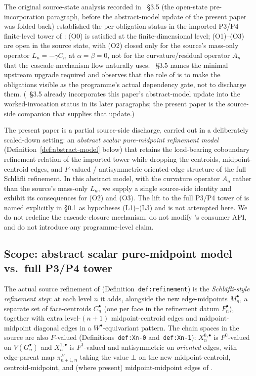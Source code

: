 \documentclass[11pt]{article}
\theoremstyle{plain}
\theoremstyle{definition}
\theoremstyle{remark}
\begin{document}
The original source-state analysis recorded in
\cite{CascadeMechanism}~\S3.5 (the open-state pre-incorporation
paragraph, before the abstract-model update of the present paper
was folded back) established the per-obligation status in the
imported P3/P4 finite-level tower of
\cite{CascadeRefinementSpaces, CascadeClosureDynamics}: (O0) is
satisfied at the finite-dimensional level; (O1)--(O3) are open in
the source state, with (O2) closed only for the source's mass-only
operator $L_n = -\gamma C_n$ at $\alpha = \beta = 0$, not for the
curvature/residual operator $A_n$ that the cascade-mechanism flow
naturally uses. \cite{CascadeMechanism}~\S3.5 names the minimal
upstream upgrade required and observes that the role of
\cite{CascadeMechanism} is to make the obligations visible as the
programme's actual dependency gate, not to discharge them.
(\cite{CascadeMechanism}~\S3.5 already incorporates this paper's
abstract-model update into the worked-invocation status in its
later paragraphs; the present paper is the source-side companion
that supplies that update.)

The present paper is a partial source-side discharge, carried out
in a deliberately scaled-down setting: an \emph{abstract scalar
pure-midpoint refinement model} (Definition~\ref{def:abstract-model}
below) that retains the load-bearing coboundary refinement relation
of the imported tower while dropping the centroids,
midpoint-centroid edges, and $F$-valued / antisymmetric oriented-edge
structure of the full Schl\"{a}fli refinement. In this abstract
model, with the curvature operator $A_n$ rather than the source's
mass-only $L_n$, we supply a single source-side identity and
exhibit its consequences for (O2) and (O3). The lift to the full
P3/P4 tower of \cite{CascadeRefinementSpaces, CascadeClosureDynamics}
is named explicitly in \S\ref{sec:scope-and-gap} as hypotheses
\textup{(L1)}--\textup{(L3)} and is not attempted here. We do not
redefine the cascade-closure mechanism, do not modify
\cite{CascadeMechanism}'s consumer API, and do not introduce any
programme-level claim.

\subsection{Scope: abstract scalar pure-midpoint model vs.\ full P3/P4 tower}\label{sec:scope-and-gap}

The actual source refinement of \cite{CascadeRefinementSpaces}
(Definition~\texttt{def:refinement}) is the
\emph{Schl\"{a}fli-style refinement step}: at each level $n$ it
adds, alongside the new edge-midpoints $M_n^{\bullet}$, a
separate set of face-centroids $C_n^{\bullet}$ (one per face
in the refinement datum $F_n^\bullet$), together with extra
level-$(n+1)$ midpoint-centroid edges and midpoint-midpoint
diagonal edges in a $W^{\bullet}$-equivariant pattern. The chain spaces in the source
are also $F$-valued (Definitions~\texttt{def:Xn-0}
and~\texttt{def:Xn-1}): $X_n^{0, \bullet}$ is $F^{0}$-valued on
$V(G_n^{\bullet})$ and $X_n^{1, \bullet}$ is $F^{1}$-valued and
antisymmetric on \emph{oriented} edges, with edge-parent map
$\pi_{n+1, n}^{E}$ taking the value $\bot$ on the new
midpoint-centroid, centroid-midpoint, and (where present)
midpoint-midpoint edges of \cite{CascadeRefinementSpaces}.
\end{document}
